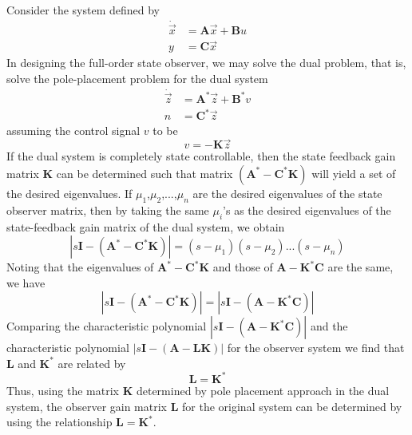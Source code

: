 \documentclass[11pt,a4paper,oneside]{book}
\numberwithin{equation}{section}
\theoremstyle{it}
\theoremstyle{definition}
\begin{document}
Consider the system defined by
\begin{equation}\label{duality_eq_1}
	\begin{split}
		\dot{\vec x} & = \mathbf{A}\vec x + \mathbf{B}u \\
		y & = \mathbf{C}\vec x
	\end{split}
\end{equation}
In designing the full-order state observer, we may solve the dual problem, that is, solve the pole-placement problem for the dual system
\begin{equation}\label{duality_eq_2}
	\begin{split}
		\dot{\vec z} & = \mathbf{A}^*\vec z + \mathbf{B}^*v \\
		n & = \mathbf{C}^*\vec z
	\end{split}
\end{equation}
assuming the control signal $v$ to be
\begin{equation}\label{duality_eq_3}
v=-\mathbf{K}\vec z
\end{equation}
If the dual system is completely state controllable, then the state feedback gain matrix $\mathbf{K}$ can be determined such that matrix $(\mathbf{A}^*-\mathbf{C}^*\mathbf{K})$ will yield a set of the desired eigenvalues.
If $\mu_1$,$\mu_2$,$...$,$\mu_n$ are the desired eigenvalues of the state observer matrix, then by taking the same $\mu_i$'s as the desired eigenvalues of the state-feedback gain matrix of the dual system, we obtain
\begin{equation}\label{duality_eq_4}
|s\mathbf{I-(A^* - C^*K)}|= (s-\mu_1)(s-\mu_2)...(s-\mu_n)
\end{equation}
Noting that the eigenvalues of $\mathbf{A}^*-\mathbf{C}^*\mathbf{K}$ and those of $\mathbf{A-K}^*\mathbf{C}$ are the same, we have 
\begin{equation}\label{duality_eq_5}
|s\mathbf{I}-(\mathbf{A}^* - \mathbf{C}^*\mathbf{K})|= |s\mathbf{I}-(\mathbf{A} - \mathbf{K^*C})|
\end{equation}
Comparing the characteristic polynomial $|s\mathbf{I-(A - K^*C)}|$ and the characteristic polynomial $|s\mathbf{I-(A - LK)}|$ for the observer system we find that $\mathbf{L}$ and $\mathbf{K}^*$ are related by
\begin{equation}\label{duality_eq_6}
\mathbf{L=K^*}
\end{equation}
Thus, using the matrix $\mathbf{K}$ determined by pole placement approach in 
the dual system, the observer gain matrix $\mathbf{L}$ for the original system 
can be determined by using the relationship $\mathbf{L=K^*}$.
\end{document}
